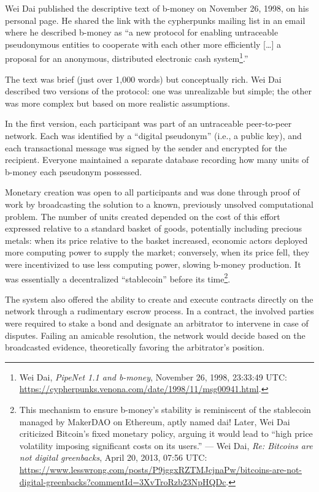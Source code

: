 \documentclass[
  a5paper,
  smalldemyvopaper,10pt,twoside,onecolumn,openright,extrafontsizes,hidelinks]{memoir}
\begin{document}
Wei Dai published the descriptive text of b-money on November 26, 1998,
on his personal page. He shared the link with the cypherpunks mailing
list in an email where he described b-money as ``a new protocol for
enabling untraceable pseudonymous entities to cooperate with each other
more efficiently {[}\ldots{]} a proposal for an anonymous, distributed
electronic cash system\footnote{Wei Dai, \emph{PipeNet 1.1 and b-money},
  November 26, 1998, 23:33:49 UTC:
  \url{https://cypherpunks.venona.com/date/1998/11/msg00941.html}.}.''

The text was brief (just over 1,000 words) but conceptually rich. Wei
Dai described two versions of the protocol: one was unrealizable but
simple; the other was more complex but based on more realistic
assumptions.

In the first version, each participant was part of an untraceable
peer-to-peer network. Each was identified by a ``digital pseudonym''
(i.e., a public key), and each transactional message was signed by the
sender and encrypted for the recipient. Everyone maintained a separate
database recording how many units of b-money each pseudonym possessed.

Monetary creation was open to all participants and was done through
proof of work by broadcasting the solution to a known, previously
unsolved computational problem. The number of units created depended on
the cost of this effort expressed relative to a standard basket of
goods, potentially including precious metals: when its price relative to
the basket increased, economic actors deployed more computing power to
supply the market; conversely, when its price fell, they were
incentivized to use less computing power, slowing b-money production. It
was essentially a decentralized ``stablecoin'' before its
time\footnote{This mechanism to ensure b-money's stability is
  reminiscent of the stablecoin managed by MakerDAO on Ethereum, aptly
  named dai! Later, Wei Dai criticized Bitcoin's fixed monetary policy,
  arguing it would lead to ``high price volatility imposing significant
  costs on its users.'' --- Wei Dai, \emph{Re: Bitcoins are not digital
  greenbacks}, April 20, 2013, 07:56 UTC:
  \url{https://www.lesswrong.com/posts/P9jggxRZTMJcjnaPw/bitcoins-are-not-digital-greenbacks?commentId=3XvTroRzb23NpHQDc}.}.

The system also offered the ability to create and execute contracts
directly on the network through a rudimentary escrow process. In a
contract, the involved parties were required to stake a bond and
designate an arbitrator to intervene in case of disputes. Failing an
amicable resolution, the network would decide based on the broadcasted
evidence, theoretically favoring the arbitrator's position.
\end{document}
